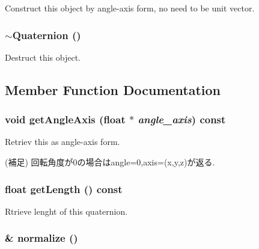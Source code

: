 Construct this object by angle-axis form, no need to be unit vector. \hypertarget{classm3g_1_1Quaternion_6e9a147677b9ffd583c59e9d06c3d938}{
\subsubsection[{$\sim$Quaternion}]{\setlength{\rightskip}{0pt plus 5cm}$\sim${\bf Quaternion} ()}}
\label{classm3g_1_1Quaternion_6e9a147677b9ffd583c59e9d06c3d938}


Destruct this object. 

\subsection{Member Function Documentation}
\hypertarget{classm3g_1_1Quaternion_3049675269aef6bb333d8f83fdf6eed7}{
\subsubsection[{getAngleAxis}]{\setlength{\rightskip}{0pt plus 5cm}void getAngleAxis (float $\ast$ {\em angle\_\-axis}) const}}
\label{classm3g_1_1Quaternion_3049675269aef6bb333d8f83fdf6eed7}


Retriev this as angle-axis form.

(補足) 回転角度が0の場合はangle=0,axis=(x,y,z)が返る. \hypertarget{classm3g_1_1Quaternion_b4393f1928cea2a3baadbf9acdd99de2}{
\subsubsection[{getLength}]{\setlength{\rightskip}{0pt plus 5cm}float getLength () const}}
\label{classm3g_1_1Quaternion_b4393f1928cea2a3baadbf9acdd99de2}


Rtrieve lenght of this quaternion. \hypertarget{classm3g_1_1Quaternion_c9cc178bcc449e08499113c35feb2a2b}{
\subsubsection[{normalize}]{ \& normalize ()}}
\label{classm3g_1_1Quaternion_c9cc178bcc449e08499113c35feb2a2b}


